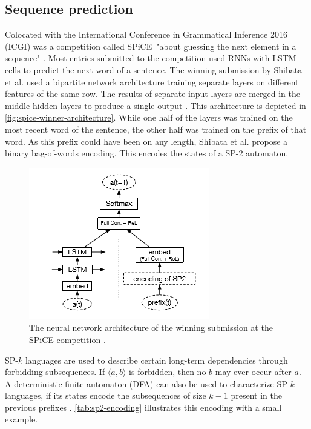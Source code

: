 \subsection{Sequence prediction}
Colocated with the International Conference in Grammatical Inference 2016 (ICGI) was a competition called SPiCE\ "about guessing the next element in a sequence" \cite{web:spice}.
Most entries submitted to the competition used RNNs with LSTM cells to predict the next word of a sentence.
The winning submission by Shibata et al. used a bipartite network architecture training separate layers on different features of the same row. The results of separate input layers are merged in the middle hidden layers to produce a single output \cite{shibata2016bipartite}. This architecture is depicted in \autoref{fig:spice-winner-architecture}.
While one half of the layers was trained on the most recent word of the sentence, the other half was trained on the prefix of that word. As this prefix could have been on any length, Shibata et al. propose a binary bag-of-words encoding. This encodes the states of a SP-2 automaton.

\begin{figure}
    \centering
    \includegraphics[height=.5\textwidth]{gfx/spice-winner-architecture.png}
    \caption{The neural network architecture of the winning submission at the SPiCE competition \cite{shibata2016bipartite}.}
    \label{fig:spice-winner-architecture}
\end{figure}

SP-$k$ languages are used to describe certain long-term dependencies through forbidding subsequences. If $\langle a,b \rangle$ is forbidden, then no $b$ may ever occur after $a$. A deterministic finite automaton (DFA) can also be used to characterize SP-$k$ languages, if its states encode the subsequences of size $k-1$  present in the previous prefixes \cite{heinz2010estimatingSP}. \autoref{tab:sp2-encoding} illustrates this encoding with a small example.


